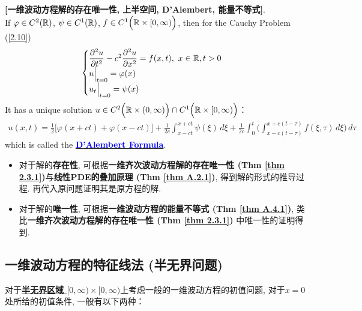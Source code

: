 	\begin{thm}\label{thm 2.3.2}
		\textbf{[一维波动方程解的存在唯一性, 上半空间, D'Alembert, 能量不等式]}. \\
		If $\varphi \in C^2(\mathbb{R})$, $\psi \in C^1(\mathbb{R})$, $f \in C^1 \Big( \mathbb{R} \times [0 , \infty) \Big)$, then for the Cauchy Problem (\ref{2.10})
		\begin{align*}
			\begin{cases}
				\dfrac{\partial^2 u}{\partial t^2} - c^2 \dfrac{\partial^2 u}{\partial x^2} = f(x , t) , \,\, x \in \mathbb{R} , t > 0 \\
				u \Big|_{t = 0} = \varphi(x) \\
				u_t \Big|_{t = 0} = \psi(x)
			\end{cases}
		\end{align*}
		It has a unique solution $u \in C^2 \Big( \mathbb{R} \times (0 , \infty) \Big) \cap C^1 \Big( \mathbb{R} \times [0 , \infty) \Big)$：
		\begin{align}
			u(x , t) = \frac{1}{2} \Big[ \varphi(x + ct) + \varphi(x - ct) \Big] + \frac{1}{2c} \int_{x - ct}^{x + ct} \psi(\xi) \, d\xi + \frac{1}{2c} \int_{0}^t \Big( \int_{x - c(t - \tau)}^{x + c(t - \tau)} f(\xi , \tau) \, d\xi \Big) \, d\tau \label{2.14}
		\end{align}
		which is called the \underline{\textcolor{blue}{\textbf{D'Alembert Formula}}}. 
		
		\vspace*{4em}
		
		\begin{rmk}
			\begin{itemize}
				\item 对于解的\textbf{存在性}, 可根据\textbf{一维齐次波动方程解的存在唯一性 (Thm \ref{thm 2.3.1})}与\textbf{线性PDE的叠加原理 (Thm \ref{thm A.2.1})}, 得到解的形式的推导过程. 再代入原问题证明其是原方程的解. 
				
				\vspace*{2em}
				
				\item 对于解的\textbf{唯一性}, 可根据\textbf{一维波动方程的能量不等式 (Thm \ref{thm A.4.1})}, 类比\textbf{一维齐次波动方程解的存在唯一性 (Thm \ref{thm 2.3.1})} 中唯一性的证明得到. 
			\end{itemize}
		\end{rmk}
	\end{thm}

\newpage

\subsection{一维波动方程的特征线法 (半无界问题)}
	对于\underline{\textbf{半无界区域 $[0 , \infty) \times [0 , \infty)$}}上考虑一般的一维波动方程的初值问题, 对于$x = 0$ 处所给的初值条件, 一般有以下两种：
	
